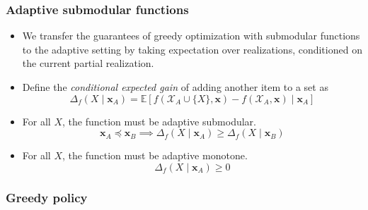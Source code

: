 \documentclass[handout]{beamer}
\begin{document}
\begin{frame}\frametitle{Adaptive submodular functions}
\begin{itemize}
    \item We transfer the guarantees of greedy optimization with submodular functions to the adaptive setting by taking expectation over realizations, conditioned on the current partial realization.
    \pause
    \item Define the \emph{conditional expected gain} of adding another item to a set as
$$\Delta_f(X \mid \mathbf{x}_A) = \mathbb{E}\left[ f(\mathcal{X}_A \cup \{X\}, \mathbf{x}) - f(\mathcal{X}_A, \mathbf{x}) \mid \mathbf{x}_A \right]$$
    \pause
    \item For all $X$, the function must be adaptive submodular. %
$$\mathbf{x}_A \preceq \mathbf{x}_B \implies \Delta_f(X \mid \mathbf{x}_A) \geq \Delta_f(X \mid \mathbf{x}_B)$$
    \pause
    \item For all $X$, the function must be adaptive monotone.
$$\Delta_f(X \mid \mathbf{x}_A) \geq 0$$
\end{itemize}
\end{frame}

\begin{frame}\frametitle{Greedy policy}
\begin{algorithm}[H]
\end{algorithm}
\end{frame}
\end{document}
